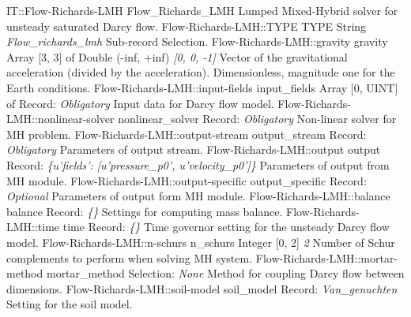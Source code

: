 \begin{RecordType}
	{IT::Flow-Richards-LMH}
	{Flow{\_}Richards{\_}LMH}
	{} %
	{} %
	{{{Lumped Mixed-Hybrid solver for unsteady saturated Darcy flow.}}}
		\RecKey
			{Flow-Richards-LMH::TYPE}
			{TYPE}
			{{String}}
			{ \it{Flow{\_}richards{\_}lmh} }
			{{{Sub-record Selection.}}}
		\RecKey
			{Flow-Richards-LMH::gravity}
			{gravity}
			{{Array [3, 3] of }{Double (-inf, +inf)}}
			{ \it{[0, 0, -1]} }
			{{{Vector of the gravitational acceleration (divided by the acceleration). Dimensionless, magnitude one for the Earth conditions.}}}
		\RecKey
			{Flow-Richards-LMH::input-fields}
			{input{\_}fields}
			{{Array [0, UINT] of }{Record}{: }}
			{ \it{Obligatory} }
			{{{Input data for Darcy flow model.}}}
		\RecKey
			{Flow-Richards-LMH::nonlinear-solver}
			{nonlinear{\_}solver}
			{{Record}{: }}
			{ \it{Obligatory} }
			{{{Non-linear solver for MH problem.}}}
		\RecKey
			{Flow-Richards-LMH::output-stream}
			{output{\_}stream}
			{{Record}{: }}
			{ \it{Obligatory} }
			{{{Parameters of output stream.}}}
		\RecKey
			{Flow-Richards-LMH::output}
			{output}
			{{Record}{: }}
			{ \it{{\{}u'fields': [u'pressure{\_}p0', u'velocity{\_}p0']{\}}} }
			{{{Parameters of output from MH module.}}}
		\RecKey
			{Flow-Richards-LMH::output-specific}
			{output{\_}specific}
			{{Record}{: }}
			{ \it{Optional} }
			{{{Parameters of output form MH module.}}}
		\RecKey
			{Flow-Richards-LMH::balance}
			{balance}
			{{Record}{: }}
			{ \it{{\{}{\}}} }
			{{{Settings for computing mass balance.}}}
		\RecKey
			{Flow-Richards-LMH::time}
			{time}
			{{Record}{: }}
			{ \it{{\{}{\}}} }
			{{{Time governor setting for the unsteady Darcy flow model.}}}
		\RecKey
			{Flow-Richards-LMH::n-schurs}
			{n{\_}schurs}
			{{Integer [0, 2]}}
			{ \it{2} }
			{{{Number of Schur complements to perform when solving MH system.}}}
		\RecKey
			{Flow-Richards-LMH::mortar-method}
			{mortar{\_}method}
			{{Selection}{: }}
			{ \it{None} }
			{{{Method for coupling Darcy flow between dimensions.}}}
		\RecKey
			{Flow-Richards-LMH::soil-model}
			{soil{\_}model}
			{{Record}{: }}
			{ \it{Van{\_}genuchten} }
			{{{Setting for the soil model.}}}
\end{RecordType}
